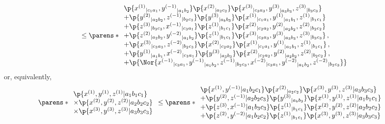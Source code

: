 \begin{widetext}
\begin{align}
{\begin{array}{l}
\end{array}}
         \leq
 \parens*{\begin{array}{l}
\p{ {x^{(1)}}_{|c_1 a_1} , {y^{(-1)}}_{|a_1 b_2} }\p{ {x^{(2)}}_{|a_2 c_2} }\p{ {x^{(3)}}_{|c_3 a_3} , {y^{(3)}}_{|a_3 b_3} , {z^{(3)}}_{|b_3 c_3} }
\\ + \p{ {y^{(2)}}_{|a_2 b_2} , {z^{(-1)}}_{|b_2 c_3} }\p{ {y^{(3)}}_{|a_b b_3} }\p{ {x^{(1)}}_{|c_1 a_1} , {y^{(1)}}_{|a_1 b_1} , {z^{(1)}}_{|b_1 c_1} }
\\ + \p{ {z^{(3)}}_{|b_3 c_3} , {x^{(-1)}}_{|c_3 a_1} }\p{ {z^{(1)}}_{|b_1 c_1} }\p{ {x^{(2)}}_{|c_2 a_2} , {y^{(2)}}_{|a_2 b_2} , {z^{(2)}}_{|b_2 c_2} }
\\ + \p{ {z^{(2)}}_{|a_2 b_2} , {y^{(-2)}}_{|a_1 b_2} }\p{ {z^{(1)}}_{|b_1 c_1} }\p{ {x^{(3)}}_{|c_3 a_3} , {y^{(3)}}_{|a_3 b_3} , {z^{(3)}}_{|b_3 c_3} } \,,
\\ + \p{ {x^{(3)}}_{|c_3 a_3} , {z^{(-2)}}_{|b_2 c_3} }\p{ {x^{(2)}}_{|c_2 a_2} }\p{ {x^{(1)}}_{|c_1 a_1} , {y^{(1)}}_{|a_1 b_1} , {z^{(1)}}_{|b_1 c_1} } \,,
\\ + \p{ {y^{(1)}}_{|a_1 b_1} , {x^{(-2)}}_{|c_3 a_1} }\p{ {y^{(3)}}_{|a_3 b_3} }\p{ {x^{(2)}}_{|c_2 a_2} , {y^{(2)}}_{|a_2 b_2} , {z^{(2)}}_{|b_2 c_2} } \,,
\\ + \p{\Nor{ {x^{(-1)}}_{|c_3 a_1} , {y^{(-1)}}_{|a_1 b_2} , {z^{(-1)}}_{|b_2 c_3} , {x^{(-2)}}_{|c_3 a_1} , {y^{(-2)}}_{|a_1 b_2} , {z^{(-2)}}_{|b_2 c_3} }}
\end{array}}
\end{align}
or, equivalently,
\begin{align}
&\parens*{\begin{array}{l}
  \p{ {x^{(1)}} , {y^{(1)}} , {z^{(1)}} | a_1 b_1 c_1}
   \\\times\p{ {x^{(2)}} , {y^{(2)}} , {z^{(2)}} | a_2 b_2 c_2}
   \\\times\p{ {x^{(3)}} , {y^{(3)}} , {z^{(3)}} | a_3 b_3 c_3}
\end{array}}
         \leq
 \parens*{\begin{array}{l}
    \p{ {x^{(1)}} , {y^{(-1)}} | a_1 b_2 c_1 }\p{{x^{(2)}}_{| a_2 c_2} }\p{ {x^{(3)}} , {y^{(3)}} , {z^{(3)}} | a_3 b_3 c_3 }
\\ +\p{ {y^{(2)}} , {z^{(-1)}} | a_2 b_2 c_3 }\p{{y^{(3)}}_{| a_b b_3} }\p{ {x^{(1)}} , {y^{(1)}} , {z^{(1)}} | a_1 b_1 c_1 }
\\ +\p{ {z^{(3)}} , {x^{(-1)}} | a_1 b_3 c_3 }\p{{z^{(1)}}_{| b_1 c_1} }\p{ {x^{(2)}} , {y^{(2)}} , {z^{(2)}} | a_2 b_2 c_2 }
\\ +\p{ {z^{(2)}} , {y^{(-2)}} | a_1 b_2 c_2 }\p{{z^{(1)}}_{| b_1 c_1} }\p{ {x^{(3)}} , {y^{(3)}} , {z^{(3)}} | a_3 b_3 c_3 }

\end{array}}
\end{align}
\end{widetext}
